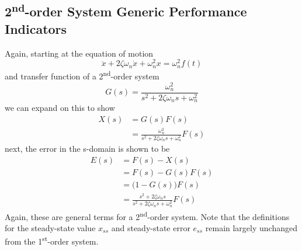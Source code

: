 \documentclass[12pt,letter]{article}
\numberwithin{ex}{section} %
\numberwithin{re}{section} %
\numberwithin{equation}{section}	%
\begin{document}
\subsection{2\textsuperscript{nd}-order System Generic Performance Indicators}

%



Again, starting at the equation of motion
\begin{equation}
\ddot{x} + 2 \zeta \omega_n \dot{x} + \omega_n^2 x = \omega_n^2 f(t)
\end{equation}
and transfer function of a 2\textsuperscript{nd}-order system
\begin{equation}
G(s) = \frac{\omega_n^2}{s^2 + 2 \zeta \omega_n s + \omega_n^2}
\end{equation}
we can expand on this to show
\begin{align}
X(s) &= G(s)F(s) \\
&=  \frac{\omega_n^2}{s^2 + 2 \zeta \omega_n s + \omega_n^2} F(s) \nonumber
\end{align}
next, the error in the s-domain is shown to be
\begin{align}
E(s) &= F(s) - X(s) \\
&= F(s) - G(s)F(s) \nonumber \\ 
&= \big( 1-G(s) \big) F(s) \nonumber \\  
&= \frac{s^2 + 2 \zeta \omega_n s}{s^2 + 2 \zeta \omega_n s + \omega_n^2} F(s) \nonumber
\end{align}
Again, these are general terms for a 2\textsuperscript{nd}-order system. Note that the definitions for the steady-state value $x_{ss}$ and steady-state error $e_{ss}$ remain largely unchanged from the 1\textsuperscript{st}-order system.
\end{document}
